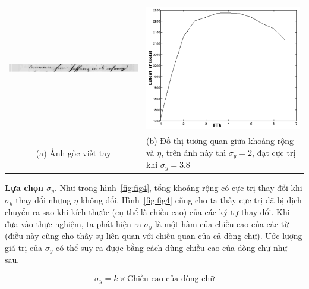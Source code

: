 \documentclass[a4paper]{article}
\begin{document}
\begin{table}[ht]
\centering
\begin{tabular}{cM}
\includegraphics[scale=0.35]{imgs/a_line_img_1.png} & \includegraphics[scale=0.35]{imgs/ploty2n38.png} \\
(a) Ảnh gốc viết tay & (b) Đồ thị tương quan giữa khoảng rộng và $\eta$, trên ảnh này thì $\sigma_y = 2$, đạt cực trị khi $\sigma_y = 3.8$ \\
\end{tabular}
\label{fig:fig3}
\end{table}

\textbf{Lựa chọn $\sigma_y$}. Như trong hình~\ref{fig:fig4}, tổng khoảng rộng có cực trị thay đổi khi $\sigma_y$ thay đổi nhưng $\eta$ không đổi. Hình~\ref{fig:fig4} cũng cho ta thấy cực trị đã bị dịch chuyển ra sao khi kích thước (cụ thể là chiều cao) của các ký tự thay đổi. Khi đưa vào thực nghiệm, ta phát hiện ra $\sigma_y$ là một hàm của chiều cao của các từ (điều này cũng cho thấy sự liên quan với chiều quan của cả dòng chữ). Ước lượng giá trị của $\sigma_y$ có thể suy ra được bằng cách dùng chiều cao của dòng chữ như sau.

\begin{equation}
\sigma_y = k \times \text{Chiều cao của dòng chữ}
\end{equation}
\end{document}
